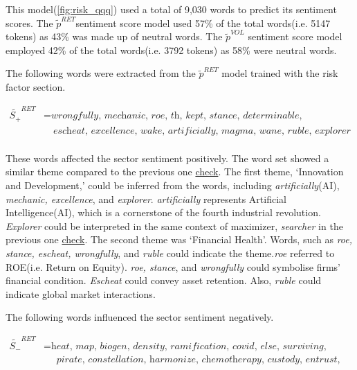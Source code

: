 \documentclass[logo,bsc,singlespacing,parskip]{infthesis}
\begin{document}
\label{word_risk_qqq}

This model(\ref{fig:risk_qqq}) used a total of 9,030 words to predict its sentiment scores. The $\tilde{p}^{RET}$sentiment score model used 57\% of the total words(i.e. 5147 tokens) as 43\% was made up of neutral words. The $\tilde{p}^{VOL}$ sentiment score model employed 42\% of the total words(i.e. 3792 tokens) as 58\% were neutral words. 

The following words were extracted from the $\tilde{p}^{RET}$ model trained with the risk factor section.

\begin{align*}
\tilde{S_{+}}^{RET} &= \textit{wrongfully, mechanic, roe, th, kept, stance, determinable,} \\
               &\quad \textit{escheat, excellence, wake, artificially, magma, wane, ruble, explorer} \\
\end{align*}

These words affected the sector sentiment positively. The word set showed a similar theme compared to the previous one \hyperref[word_all_qqq]{check}. The first theme, ‘Innovation and Development,’ could be inferred from the words, including \textit{artificially}(AI), \textit{mechanic, excellence}, and \textit{explorer}. \textit{artificially} represents Artificial Intelligence(AI), which is a cornerstone of the fourth industrial revolution. \textit{Explorer} could be interpreted in the same context of maximizer, \textit{searcher} in the previous one \hyperref[word_all_qqq]{check}. The second theme was ‘Financial Health’. Words, such as \textit{roe, stance, escheat, wrongfully}, and \textit{ruble} could indicate the theme.\textit{roe} referred to ROE(i.e. Return on Equity). \textit{roe, stance}, and \textit{wrongfully} could symbolise firms’ financial condition. \textit{Escheat} could convey asset retention. Also, \textit{ruble} could indicate global market interactions.

The following words influenced the sector sentiment negatively. 

\begin{align*}
\tilde{S_{-}}^{RET} &= \textit{heat, map, biogen, density, ramification, covid, else, surviving,} \\
               &\quad \textit{ pirate, constellation, harmonize, chemotherapy, custody, entrust, kinase} \\
\end{align*}
\end{document}
